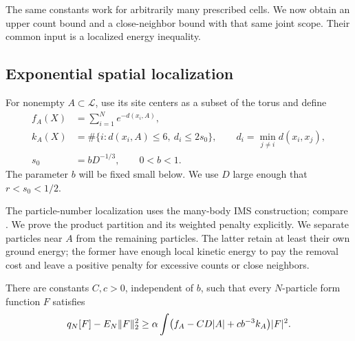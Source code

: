 The same constants work for arbitrarily many prescribed cells.  We now
obtain an upper count bound and a close-neighbor bound with that same joint
scope.  Their common input is a localized energy inequality.

\subsection{Exponential spatial localization}

For nonempty $A\subset\mathcal L$, use its site centers as a subset of
the torus and define
\begin{align}
 f_A(X)&=\sum_{i=1}^N e^{-d(x_i,A)},\label{sp:weighted-count}\\
 k_A(X)&=\#\{i:d(x_i,A)\le6,\ d_i\le2s_0\},
 \qquad d_i=\min_{j\ne i}d(x_i,x_j),\label{sp:localized-close-count}\\
 s_0&=bD^{-1/3},\qquad 0<b<1.\label{sp:separation-scale}
\end{align}
The parameter $b$ will be fixed small below.  We use $D$ large enough
that $r<s_0<1/2$.

The particle-number localization uses the many-body IMS construction;
compare \cite[Section~3]{Lewin2011}. We prove the product partition and its
weighted penalty explicitly.  We separate particles near $A$ from the
remaining particles.  The latter retain at least their own ground energy;
the former have enough local kinetic energy to pay the removal cost and
leave a positive penalty for excessive counts or close neighbors.

\begin{lemma}\label{sp:localized-form}
There are constants $C,c>0$, independent of $b$, such that every
$N$-particle form function $F$ satisfies
\begin{equation}\label{sp:localized-form-bound}
 q_N[F]-E_N\lVert F\rVert_2^2
   \ge\alpha\int\bigl(f_A-CD|A|+cb^{-3}k_A\bigr)|F|^2.
\end{equation}
\end{lemma}

